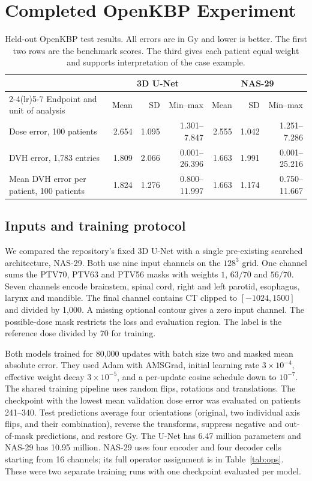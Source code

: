 \documentclass[letterpaper]{article}
\begin{document}
\section{Completed OpenKBP Experiment}
\begin{table}[t]
\centering
\begin{tabular}{lrrrrrr}
\toprule
& \multicolumn{3}{c}{3D U-Net} & \multicolumn{3}{c}{NAS-29}\\
\cmidrule(lr){2-4}\cmidrule(lr){5-7}
Endpoint and unit of analysis & Mean & SD & Min--max & Mean & SD & Min--max\\
\midrule
Dose error, 100 patients & 2.654 & 1.095 & 1.301--7.847 & 2.555 & 1.042 & 1.251--7.286\\
DVH error, 1,783 entries & 1.809 & 2.066 & 0.001--26.396 & 1.663 & 1.991 & 0.001--25.216\\
Mean DVH error per patient, 100 patients & 1.824 & 1.276 & 0.800--11.997 & 1.663 & 1.174 & 0.750--11.667\\
\bottomrule
\end{tabular}
\caption{Held-out OpenKBP test results. All errors are in Gy and lower is better. The first two rows are the benchmark scores. The third gives each patient equal weight and supports interpretation of the case example.}
\label{tab:results}
\end{table}

\subsection{Inputs and training protocol}
We compared the repository's fixed 3D U-Net with a single pre-existing searched architecture, NAS-29. Both use nine input channels on the $128^3$ grid. One channel sums the PTV70, PTV63 and PTV56 masks with weights $1$, $63/70$ and $56/70$. Seven channels encode brainstem, spinal cord, right and left parotid, esophagus, larynx and mandible. The final channel contains CT clipped to $[-1024,1500]$ and divided by 1,000. A missing optional contour gives a zero input channel. The possible-dose mask restricts the loss and evaluation region. The label is the reference dose divided by 70 for training.

Both models trained for 80,000 updates with batch size two and masked mean absolute error. They used Adam with AMSGrad, initial learning rate $3\times10^{-4}$, effective weight decay $3\times10^{-5}$, and a per-update cosine schedule down to $10^{-7}$. The shared training pipeline uses random flips, rotations and translations. The checkpoint with the lowest mean validation dose error was evaluated on patients 241--340. Test predictions average four orientations (original, two individual axis flips, and their combination), reverse the transforms, suppress negative and out-of-mask predictions, and restore Gy. The U-Net has 6.47 million parameters and NAS-29 has 10.95 million. NAS-29 uses four encoder and four decoder cells starting from 16 channels; its full operator assignment is in Table~\ref{tab:ops}. These were two separate training runs with one checkpoint evaluated per model.
\end{document}

